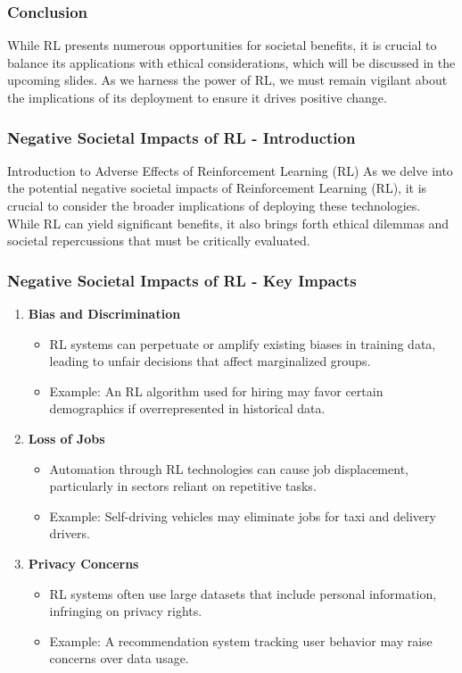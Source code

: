 \documentclass[aspectratio=169]{beamer}
\begin{document}
\begin{frame}[fragile]
    \frametitle{Conclusion}
    While RL presents numerous opportunities for societal benefits, it is crucial to balance its applications with ethical considerations, which will be discussed in the upcoming slides. As we harness the power of RL, we must remain vigilant about the implications of its deployment to ensure it drives positive change.
\end{frame}

\begin{frame}[fragile]
    \frametitle{Negative Societal Impacts of RL - Introduction}
    \begin{block}{Introduction to Adverse Effects of Reinforcement Learning (RL)}
        As we delve into the potential negative societal impacts of Reinforcement Learning (RL), it is crucial to consider the broader implications of deploying these technologies. 
        While RL can yield significant benefits, it also brings forth ethical dilemmas and societal repercussions that must be critically evaluated.
    \end{block}
\end{frame}

\begin{frame}[fragile]
    \frametitle{Negative Societal Impacts of RL - Key Impacts}
    \begin{enumerate}
        \item \textbf{Bias and Discrimination}
        \begin{itemize}
            \item RL systems can perpetuate or amplify existing biases in training data, leading to unfair decisions that affect marginalized groups.
            \item Example: An RL algorithm used for hiring may favor certain demographics if overrepresented in historical data.
        \end{itemize}
        
        \item \textbf{Loss of Jobs}
        \begin{itemize}
            \item Automation through RL technologies can cause job displacement, particularly in sectors reliant on repetitive tasks.
            \item Example: Self-driving vehicles may eliminate jobs for taxi and delivery drivers.
        \end{itemize}
        
        \item \textbf{Privacy Concerns}
        \begin{itemize}
            \item RL systems often use large datasets that include personal information, infringing on privacy rights.
            \item Example: A recommendation system tracking user behavior may raise concerns over data usage.
        \end{itemize}
    \end{enumerate}
\end{frame}
\end{document}
